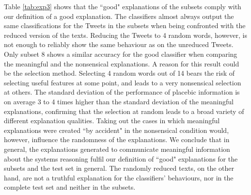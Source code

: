 \noindent Table \ref{tab:exp3} shows that the ``good" explanations of the subsets comply with our definition of a good explanation. The classifiers almost always output the same classifications for the Tweets in the subsets when being confronted with the reduced version of the texts. Reducing the Tweets to 4 random words, however, is not enough to reliably show the same behaviour as on the unreduced Tweets. Only subset 8 shows a similar accuracy for the good classifier when comparing the meaningful and the nonsensical explanations. A reason for this result could be the selection method. Selecting 4 random words out of 14 bears the risk of selecting useful features at some point, and leads to a very nonsensical selection at others. The standard deviation of the performance of placebic information is on average 3 to 4 times higher than the standard deviation of the meaningful explanations, confirming that the selection at random leads to a broad variety of different explanation qualities. Taking out the cases in which meaningful explanations were created ``by accident" in the nonsensical condition would, however, influence the randomness of the explanations.\newline
We conclude that in general, the explanations generated to communicate meaningful information about the systems reasoning fulfil our definition of ``good" explanations for the subsets and the test set in general. The randomly reduced texts, on the other hand, are not a truthful explanation for the classifiers' behaviours, nor in the complete test set and neither in the subsets. 

